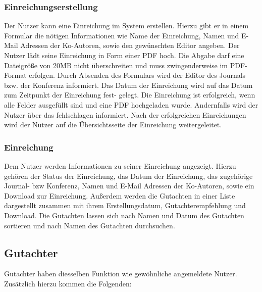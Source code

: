 \subsubsection{Einreichungserstellung}
\begin{description}
    \XXitem{} Der Nutzer kann eine Einreichung im System erstellen. Hierzu gibt er in einem
    Formular die nötigen Informationen wie Name der Einreichung, Namen und E-Mail Adressen der Ko-Autoren,
    sowie den gewünschten Editor angeben.
    \XXitem{} Der Nutzer lädt seine Einreichung in Form einer PDF hoch. Die Abgabe darf eine Dateigröße
    von 20MB nicht überschreiten und muss zwingenderweise im PDF-Format erfolgen.
    \XXitem{} Durch Absenden des Formulars wird der Editor des Journals bzw. der Konferenz
    informiert. Das Datum der Einreichung wird auf das Datum zum Zeitpunkt der Einreichung fest-
    gelegt.
    \XXitem{} Die Einreichung ist erfolgreich, wenn alle Felder ausgefüllt sind und eine PDF
    hochgeladen wurde. Andernfalls wird der Nutzer über das fehlschlagen informiert.
    \XXitem{} Nach der erfolgreichen Einreichungen wird der Nutzer auf die Übersichtsseite der
    Einreichung weitergeleitet.
\end{description}

\subsubsection{Einreichung}
\begin{description}
     Dem Nutzer werden Informationen zu seiner Einreichung angezeigt.
    Hierzu gehören der Status der Einreichung, das Datum der Einreichung, das zugehörige
    Journal- bzw Konferenz, Namen und E-Mail Adressen der Ko-Autoren, sowie ein Download zur Einreichung.
    \XXitem{} Außerdem werden die Gutachten in einer
    Liste dargestellt zusammen mit ihrem Erstellungsdatum, Gutachterempfehlung und Download. %
    \XXitem{} Die Gutachten lassen sich nach Namen und Datum
    des Gutachten sortieren und nach Namen des Gutachten durchsuchen. %
\end{description}

\subsection{Gutachter}
Gutachter haben diesselben Funktion wie gewöhnliche angemeldete Nutzer. Zusätzlich hierzu kommen
die Folgenden:

